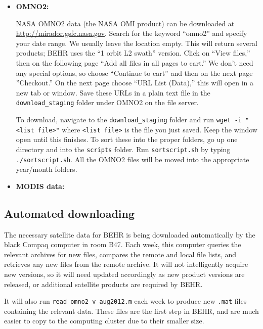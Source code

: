 \documentclass[12pt]{article}
\begin{document}
	\begin{itemize}
	
	\item \textbf{OMNO2:}
	
		NASA OMNO2 data (the NASA OMI  product) can be downloaded at \url{http://mirador.gsfc.nasa.gov}. Search for the keyword ``omno2'' and specify your date range. We usually leave the location empty. This will return several products; BEHR uses the ``1 orbit L2 swath'' version. Click on ``View files,'' then on the following page ``Add all files in all pages to cart.''  We don't need any special options, so choose ``Continue to cart'' and then on the next page ''Checkout.'' On the next page choose ``URL List (Data),'' this will open in a new tab or window. Save these URLs in a plain text file in the \texttt{download\_staging} folder under OMNO2 on the file server. 
		
		To download, navigate to the \texttt{download\_staging} folder and run \texttt{wget -i "<list file>"} where \texttt{<list file>} is the file you just saved. Keep the window open until this finishes. To sort these into the proper folders, go up one directory and into the \texttt{scripts} folder. Run \texttt{sortscript.sh} by typing \texttt{./sortscript.sh}. All the OMNO2 files will be moved into the appropriate year/month folders.
	
	\item \textbf{MODIS data:}
	
		
	\end{itemize}


	\subsection{Automated downloading}
	
		The necessary satellite data for BEHR is being downloaded automatically by the black Compaq computer in room B47. Each week, this computer queries the relevant archives for new files, compares the remote and local file lists, and retrieves any new files from the remote archive.  It will not intelligently acquire new versions, so it will need updated accordingly as new product versions are released, or additional satellite products are required by BEHR.
		
		It will also run \texttt{read\_omno2\_v\_aug2012.m} each week to produce new \texttt{.mat} files containing the relevant data. These files are the first step in BEHR, and are much easier to copy to the computing cluster due to their smaller size.
		
\end{document}
